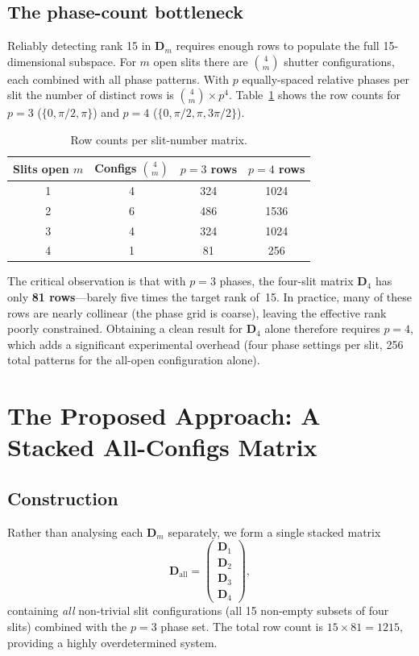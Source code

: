 \documentclass[12pt]{article}
\begin{document}
\subsection{The phase-count bottleneck}

Reliably detecting rank 15 in $\mathbf{D}_m$ requires enough rows to populate the
full 15-dimensional subspace.  For $m$ open slits there are $\binom{4}{m}$ shutter
configurations, each combined with all phase patterns.  With $p$ equally-spaced
relative phases per slit the number of distinct rows is
$\binom{4}{m} \times p^4$.  Table~\ref{tab:row_counts} shows the row counts for
$p = 3$ ($\{0, \pi/2, \pi\}$) and $p = 4$ ($\{0, \pi/2, \pi, 3\pi/2\}$).

\begin{table}[H]
\centering
\caption{Row counts per slit-number matrix.}
\label{tab:row_counts}
\begin{tabular}{cccc}
\toprule
Slits open $m$ & Configs $\binom{4}{m}$ & $p=3$ rows & $p=4$ rows \\
\midrule
1 & 4  & 324  & 1024 \\
2 & 6  & 486  & 1536 \\
3 & 4  & 324  & 1024 \\
4 & 1  & 81   & 256  \\
\bottomrule
\end{tabular}
\end{table}

The critical observation is that with $p = 3$ phases, the four-slit matrix
$\mathbf{D}_4$ has only \textbf{81 rows}---barely five times the target rank of~15.
In practice, many of these rows are nearly collinear (the phase grid is coarse),
leaving the effective rank poorly constrained.  Obtaining a clean result for
$\mathbf{D}_4$ alone therefore requires $p = 4$, which adds a significant
experimental overhead (four phase settings per slit, 256 total patterns for the
all-open configuration alone).

\section{The Proposed Approach: A Stacked All-Configs Matrix}

\subsection{Construction}

Rather than analysing each $\mathbf{D}_m$ separately, we form a single stacked matrix
\begin{equation}
    \mathbf{D}_{\mathrm{all}} = \begin{pmatrix} \mathbf{D}_1 \\ \mathbf{D}_2 \\ \mathbf{D}_3 \\ \mathbf{D}_4 \end{pmatrix},
\end{equation}
containing \emph{all} non-trivial slit configurations (all 15 non-empty subsets of
four slits) combined with the $p=3$ phase set.  The total row count is
$15 \times 81 = 1215$, providing a highly overdetermined system.
\end{document}
